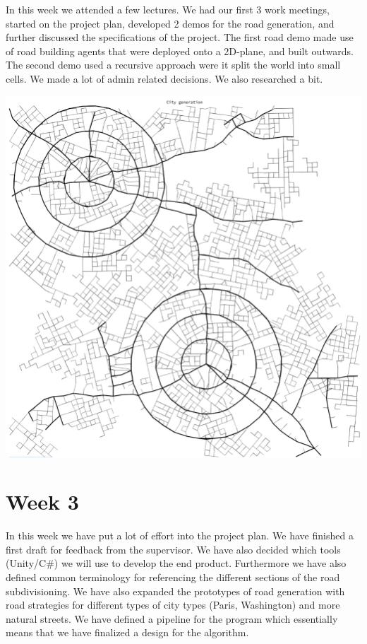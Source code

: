 \documentclass[11pt]{article}
\begin{document}
In this week we attended a few lectures.
We had our first 3 work meetings, started on the project plan, developed 2 demos
for the road generation, and further discussed the specifications of the
project.
The first road demo made use of road building agents that were deployed onto a
2D-plane, and built outwards.
The second demo used a recursive approach were it split the world into small
cells. We made a lot of admin related decisions. We also researched a bit.

\begin{w-1/2}
\begin{center}
\includegraphics[width=.9\linewidth]{./images/week1/img-000.png}
\end{center}
\end{w-1/2}

\section*{Week 3}
\label{sec:org5481319}
In this week we have put a lot of effort into the project plan. We have finished
a first draft for feedback from the supervisor. We have also decided which tools
(Unity/C\#) we will use to develop the end product.  Furthermore we have also
defined common terminology for referencing the different sections of the road
subdivisioning. We have also expanded the prototypes of road generation with
road strategies for different types of city types (Paris, Washington) and more
natural streets. We have defined a pipeline for the program which essentially
means that we have finalized a design for the algorithm.      
\end{document}

